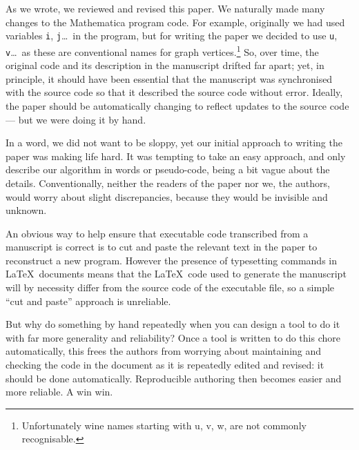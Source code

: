 \documentclass[preprint,times]{elsarticle}
\begin{document}
As we wrote, we reviewed and revised this paper. We naturally made many changes to the Mathematica program code. For example, originally we had used variables \texttt{i}, \texttt{j}\ldots\ in the program, but for writing the paper we decided to use \texttt{u}, \texttt{v}\ldots\ as these are conventional names for graph vertices.\footnote{Unfortunately wine names starting with u, v, w, are not commonly recognisable.} So, over time, the original code and its description in the manuscript drifted far apart; yet, in principle, it should have been essential that the manuscript was synchronised with the source code so that it described the source code without error. Ideally, the paper should be automatically changing to reflect updates to the source code --- but we were doing it by hand.

In a word, we did not want to be sloppy, yet our initial approach to writing the paper was making life hard. It was tempting to take an easy approach, and only describe our algorithm in words or pseudo-code, being a bit vague about the details. Conventionally, neither the readers of the paper nor we, the authors, would worry about slight discrepancies, because they would be invisible and unknown.

An obvious way to help ensure that executable code transcribed from a manuscript is correct is to cut and paste the relevant text in the paper to reconstruct a new program. However the presence of typesetting commands in \LaTeX\ documents means that the \LaTeX\ code used to generate the manuscript will by necessity differ from the source code of the executable file, so a simple ``cut and paste'' approach is unreliable. 

But why do something by hand repeatedly when you can design a tool to do it with far more generality and reliability? Once a tool is written to do this chore automatically, this frees the authors from worrying about maintaining and checking the code in the document as it is repeatedly edited and revised: it should be done automatically. Reproducible authoring then becomes easier and more reliable. A win win.
\end{document}

